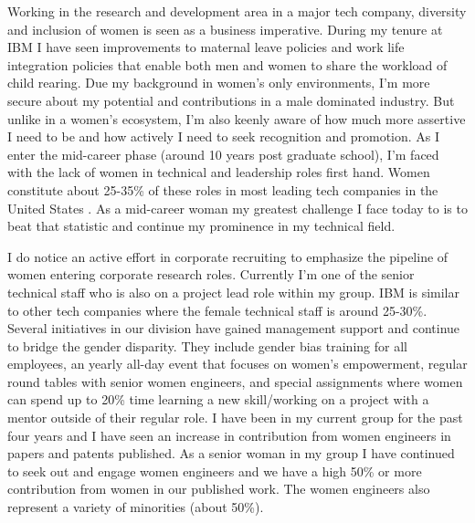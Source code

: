 \documentclass[utf8]{frontiersSCNS} %
\begin{document}
Working in the research and development area in a major tech company, diversity and inclusion of women is seen as a business imperative. During my tenure at IBM I have seen improvements to maternal leave policies and work life integration policies that enable both men and women to share the workload of child rearing. Due my background in women’s only environments, I’m more secure about my potential and contributions in a male dominated industry. But unlike in a women’s ecosystem, I’m also keenly aware of how much more assertive I need to be and how actively I need to seek recognition and promotion. As I enter the mid-career phase (around 10 years post graduate school), I’m faced with the lack of women in technical and leadership roles first hand.  Women constitute about 25-35\% of these roles in most leading tech companies in the United States \citep{techcompanies}. As a mid-career woman my greatest challenge I face today to is to beat that statistic and continue my prominence in my technical field.

I do notice an active effort in corporate recruiting to emphasize the pipeline of women entering corporate research roles. Currently I’m one of the senior technical staff who is also on a project lead role within my group. IBM is similar to other tech companies where the female technical staff is around 25-30\%.  Several initiatives in our division have gained management support and continue to bridge the gender disparity. They include gender bias training for all employees, an yearly all-day event that focuses on women’s empowerment, regular round tables with senior women engineers, and special assignments where women can spend up to 20\% time learning a new skill/working on a project with a mentor outside of their regular role. I have been in my current group for the past four years and I have seen an increase in contribution from women engineers in papers and patents published. As a senior woman in my group I have continued to seek out and engage women engineers and we have a high 50\% or more contribution from women in our published work. The women engineers also represent a variety of minorities (about 50\%).
\end{document}

